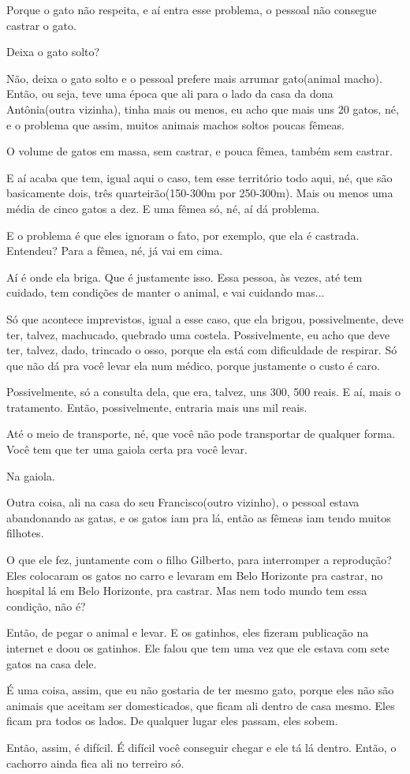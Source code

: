 \documentclass[12pt,a4paper]{article}
\newenvironment{turnos}{\begin{list}{}{\setlength{\leftmargin}{2.2cm}\setlength{\labelwidth}{2.0cm}\setlength{\labelsep}{0.2cm}\setlength{\itemsep}{0.45em}\setlength{\parsep}{0pt}}}{\end{list}}
\newcommand{\fala}[1]{\item[\textbf{#1}\hfill]}
\begin{document}
\begin{turnos}
\fala{E:} Porque o gato não respeita, e aí entra esse problema, o pessoal não consegue castrar o gato.
\fala{A:} Deixa o gato solto?
\fala{E:} Não, deixa o gato solto e o pessoal prefere mais arrumar gato(animal macho). Então, ou seja, teve uma época que ali para o lado da casa da dona Antônia(outra vizinha), tinha mais ou menos, eu acho que mais uns 20 gatos, né, e o problema que assim, muitos animais machos soltos poucas fêmeas.
\fala{A:} O volume de gatos em massa, sem castrar, e pouca fêmea, também sem castrar.
\fala{E:} E aí acaba que tem, igual aqui o caso, tem esse território todo aqui, né, que são basicamente dois, três quarteirão(150-300m por 250-300m). Mais ou menos uma média de cinco gatos a dez. E uma fêmea só, né, aí dá problema.
\fala{E:} E o problema é que eles ignoram o fato, por exemplo, que ela é castrada. Entendeu? Para a fêmea, né, já vai em cima.
\fala{E:} Aí é onde ela briga. Que é justamente isso. Essa pessoa, às vezes, até tem cuidado, tem condições de manter o animal, e vai cuidando mas...
\fala{E:} Só que acontece imprevistos, igual a esse caso, que ela brigou, possivelmente, deve ter, talvez, machucado, quebrado uma costela. Possivelmente, eu acho que deve ter, talvez, dado, trincado o osso, porque ela está com dificuldade de respirar. Só que não dá pra você levar ela num médico, porque justamente o custo é caro.
\fala{E:} Possivelmente, só a consulta dela, que era, talvez, uns 300, 500 reais. E aí, mais o tratamento. Então, possivelmente, entraria mais uns mil reais.
\fala{G:} Até o meio de transporte, né, que você não pode transportar de qualquer forma. Você tem que ter uma gaiola certa pra você levar. 
\fala{A:} Na gaiola. 
\fala{A:} Outra coisa, ali na casa do seu Francisco(outro vizinho), o pessoal estava abandonando as gatas, e os gatos iam pra lá, então as fêmeas iam tendo muitos filhotes.
\fala{A:} O que ele fez, juntamente com o filho Gilberto, para interromper a reprodução? Eles colocaram os gatos no carro e levaram em Belo Horizonte pra castrar, no hospital lá em Belo Horizonte, pra castrar. Mas nem todo mundo tem essa condição, não é?
\fala{A:} Então, de pegar o animal e levar. E os gatinhos, eles fizeram publicação na internet e doou os gatinhos. Ele falou que tem uma vez que ele estava com sete gatos na casa dele.
\fala{G:} É uma coisa, assim, que eu não gostaria de ter mesmo gato, porque eles não são animais que aceitam ser domesticados, que ficam ali dentro de casa mesmo. Eles ficam pra todos os lados. De qualquer lugar eles passam, eles sobem.
\fala{G:} Então, assim, é difícil. É difícil você conseguir chegar e ele tá lá dentro. Então, o cachorro ainda fica ali no terreiro só.

\end{turnos}
\end{document}
